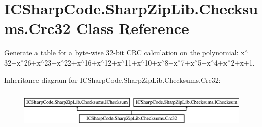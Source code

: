 \hypertarget{class_i_c_sharp_code_1_1_sharp_zip_lib_1_1_checksums_1_1_crc32}{}\section{I\+C\+Sharp\+Code.\+Sharp\+Zip\+Lib.\+Checksums.\+Crc32 Class Reference}
\label{class_i_c_sharp_code_1_1_sharp_zip_lib_1_1_checksums_1_1_crc32}


Generate a table for a byte-\/wise 32-\/bit C\+RC calculation on the polynomial\+: x$^\wedge$32+x$^\wedge$26+x$^\wedge$23+x$^\wedge$22+x$^\wedge$16+x$^\wedge$12+x$^\wedge$11+x$^\wedge$10+x$^\wedge$8+x$^\wedge$7+x$^\wedge$5+x$^\wedge$4+x$^\wedge$2+x+1.  


Inheritance diagram for I\+C\+Sharp\+Code.\+Sharp\+Zip\+Lib.\+Checksums.\+Crc32\+:\begin{figure}[H]
\begin{center}
\leavevmode
\includegraphics[height=1.848185cm]{class_i_c_sharp_code_1_1_sharp_zip_lib_1_1_checksums_1_1_crc32}
\end{center}
\end{figure}
